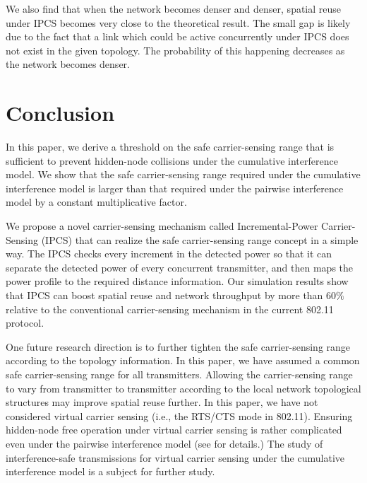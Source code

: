 \documentclass[conference]{IEEEtran}
\begin{document}
We also f\/ind that when the network becomes denser and denser,
spatial reuse under IPCS becomes very close to the theoretical
result. The small gap is likely due to the fact that a link which
could be active concurrently under IPCS does not exist in the given
topology. The probability of this happening decreases as the network
becomes denser.











\section{Conclusion}\label{conclusion}

In this paper, we derive a threshold on the safe carrier-sensing
range that is suff\/icient to prevent hidden-node collisions under
the cumulative interference model. We show that the safe
carrier-sensing range required under the cumulative interference
model is larger than that required under the pairwise interference
model by a constant multiplicative factor.

We propose a novel carrier-sensing mechanism called
Incremental-Power Carrier-Sensing (IPCS) that can realize the safe
carrier-sensing range concept in a simple way. The IPCS checks every
increment in the detected power so that it can separate the detected
power of every concurrent transmitter, and then maps the power
prof\/ile to the required distance information. Our simulation
results show that IPCS can boost spatial reuse and network
throughput by more than $60\%$ relative to the conventional
carrier-sensing mechanism in the current 802.11 protocol.

One future research direction is to further tighten the safe
carrier-sensing range according to the topology information. In this
paper, we have assumed a common safe carrier-sensing range for all
transmitters. Allowing the carrier-sensing range to vary from
transmitter to transmitter according to the local network
topological structures may improve spatial reuse further. In this
paper, we have not considered virtual carrier sensing (i.e., the
RTS/CTS mode in 802.11). Ensuring hidden-node free operation under
virtual carrier sensing is rather complicated even under the
pairwise interference model (see \cite{libinhdfvcs} for details.)
The study of interference-safe transmissions for virtual carrier
sensing under the cumulative interference model is a subject for
further study.
\end{document}
